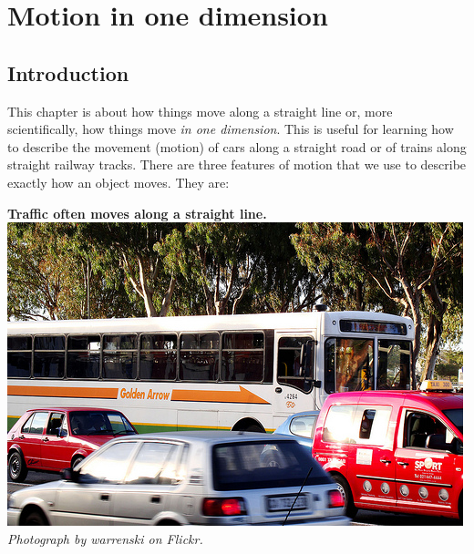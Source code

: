          \chapter{Motion in one dimension}\label{chap:motion}
    \label{804a55a564ee3ef49c7d42dbc9e03fae}
         \section{Introduction}
    \nopagebreak
\begin{minipage}{.5\textwidth}
      \label{m38787*id62184}This chapter is about how things move along a straight line or, more scientifically, how things move \textsl{in one dimension}. This is useful for learning how to describe the movement (motion) of cars along a straight road or of trains along straight railway tracks.  There are three features of motion that we use to describe exactly how an object moves. They are:\par 
\end{minipage}
\begin{minipage}{.5\textwidth}
\begin{center}
\textbf{Traffic often moves along a straight line.}\\
 \includegraphics[width=.8\textwidth]{photos/trafficby_warrenski_flickr.jpg}\\
\textit{Photograph by warrenski on Flickr.}
\end{center}
\end{minipage}
   
